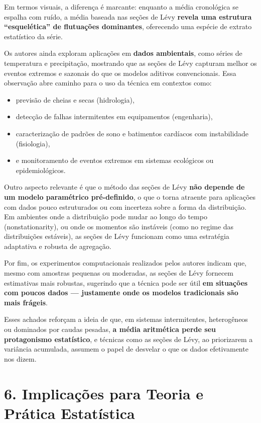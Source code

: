 \documentclass[
]{agujournal2019}
\providecommand{\tightlist}{%
  \setlength{\itemsep}{0pt}\setlength{\parskip}{0pt}}\usepackage{longtable,booktabs,array}
\begin{document}
Em termos visuais, a diferença é marcante: enquanto a média cronológica
se espalha com ruído, a média baseada nas seções de Lévy \textbf{revela
uma estrutura ``esquelética'' de flutuações dominantes}, oferecendo uma
espécie de extrato estatístico da série.

Os autores ainda exploram aplicações em \textbf{dados ambientais}, como
séries de temperatura e precipitação, mostrando que as seções de Lévy
capturam melhor os eventos extremos e sazonais do que os modelos
aditivos convencionais. Essa observação abre caminho para o uso da
técnica em contextos como:

\begin{itemize}
\tightlist
\item
  previsão de cheias e secas (hidrologia),
\item
  detecção de falhas intermitentes em equipamentos (engenharia),
\item
  caracterização de padrões de sono e batimentos cardíacos com
  instabilidade (fisiologia),
\item
  e monitoramento de eventos extremos em sistemas ecológicos ou
  epidemiológicos.
\end{itemize}

Outro aspecto relevante é que o método das seções de Lévy \textbf{não
depende de um modelo paramétrico pré-definido}, o que o torna atraente
para aplicações com dados pouco estruturados ou com incerteza sobre a
forma da distribuição. Em ambientes onde a distribuição pode mudar ao
longo do tempo (nonstationarity), ou onde os momentos são instáveis
(como no regime das distribuições estáveis), as seções de Lévy funcionam
como uma estratégia adaptativa e robusta de agregação.

Por fim, os experimentos computacionais realizados pelos autores indicam
que, mesmo com amostras pequenas ou moderadas, as seções de Lévy
fornecem estimativas mais robustas, sugerindo que a técnica pode ser
útil \textbf{em situações com poucos dados --- justamente onde os
modelos tradicionais são mais frágeis}.

Esses achados reforçam a ideia de que, em sistemas intermitentes,
heterogêneos ou dominados por caudas pesadas, \textbf{a média aritmética
perde seu protagonismo estatístico}, e técnicas como as seções de Lévy,
ao priorizarem a variância acumulada, assumem o papel de desvelar o que
os dados efetivamente nos dizem.

\section{6. Implicações para Teoria e Prática
Estatística}\label{implicauxe7uxf5es-para-teoria-e-pruxe1tica-estatuxedstica}
\end{document}
